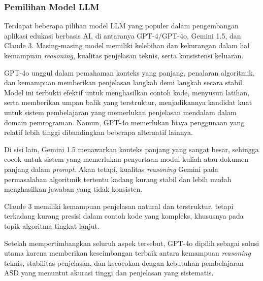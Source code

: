\subsubsection{Pemilihan Model LLM}

Terdapat beberapa pilihan model LLM yang populer dalam pengembangan aplikasi edukasi berbasis AI, di antaranya GPT-4/GPT-4o, Gemini 1.5, dan Claude 3. Masing-masing model memiliki kelebihan dan kekurangan dalam hal kemampuan \textit{reasoning}, kualitas penjelasan teknis, serta konsistensi keluaran.

GPT-4o unggul dalam pemahaman konteks yang panjang, penalaran algoritmik, dan kemampuan memberikan penjelasan langkah demi langkah secara stabil. Model ini terbukti efektif untuk menghasilkan contoh kode, menyusun latihan, serta memberikan umpan balik yang terstruktur, menjadikannya kandidat kuat untuk sistem pembelajaran yang memerlukan penjelasan mendalam dalam domain pemrograman. Namun, GPT-4o memerlukan biaya penggunaan yang relatif lebih tinggi dibandingkan beberapa alternatif lainnya.

Di sisi lain, Gemini 1.5 menawarkan konteks panjang yang sangat besar, sehingga cocok untuk sistem yang memerlukan penyertaan modul kuliah atau dokumen panjang dalam \textit{prompt}. Akan tetapi, kualitas \textit{reasoning} Gemini pada permasalahan algoritmik tertentu kadang kurang stabil dan lebih mudah menghasilkan jawaban yang tidak konsisten.

Claude 3 memiliki kemampuan penjelasan natural dan terstruktur, tetapi terkadang kurang presisi dalam contoh kode yang kompleks, khususnya pada topik algoritma tingkat lanjut.

Setelah mempertimbangkan seluruh aspek tersebut, GPT-4o dipilih sebagai solusi utama karena memberikan keseimbangan terbaik antara kemampuan \textit{reasoning} teknis, stabilitas penjelasan, dan kecocokan dengan kebutuhan pembelajaran ASD yang menuntut akurasi tinggi dan penjelasan yang sistematis.


